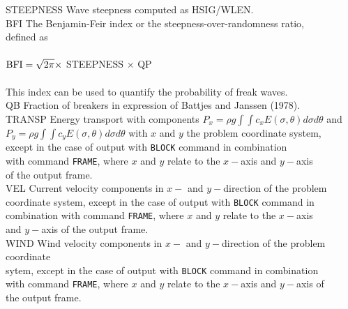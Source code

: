 \documentclass[12pt]{book}
\begin{document}
\begin{tabbing}
STEEPNESS            \> Wave steepness computed as HSIG/WLEN.\\
BFI                  \> The Benjamin-Feir index or the steepness-over-randomness ratio,\+\\
                        defined as\\
                        \\
${\rm BFI} = \sqrt{2\pi} \times$ STEEPNESS $\times$ QP \\
                        \\
                        This index can be used to quantify the probability of freak waves.\-\\
QB                   \> Fraction of breakers in expression of Battjes and Janssen (1978).\\
TRANSP               \> Energy transport with components $P_x = \rho g\int \int c_x E(\sigma,\theta)d\sigma d\theta$ and\+\\
                        $P_y = \rho g\int \int c_y E(\sigma,\theta)d\sigma d\theta$
                        with $x$ and $y$ the problem coordinate system,\\
                        except in the case of output with {\tt BLOCK} command in combination\\
                        with command {\tt FRAME}, where $x$ and $y$ relate to the $x-$axis and $y-$axis\\
                        of the output frame.\-\\
VEL                  \> Current velocity components in $x-$ and $y-$direction of the problem\+\\
                        coordinate system,
                        except in the case of output with {\tt BLOCK} command in\\
                        combination with command {\tt FRAME}, where $x$ and $y$ relate to the $x-$axis\\
                        and $y-$axis of the output frame.\-\\
WIND                 \> Wind velocity components in $x-$ and $y-$direction of the problem coordinate\+\\
                        sytem, except in the case of output with {\tt BLOCK} command in
                        combination\\
                        with command {\tt FRAME}, where $x$ and $y$ relate to the $x-$axis and $y-$axis of\\
                        the output frame.\-\\

\end{tabbing}
\end{document}
